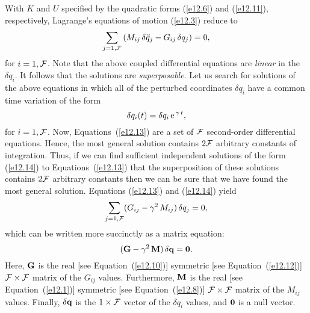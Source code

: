 With $K$ and $U$ specified by the quadratic forms (\ref{e12.6}) and (\ref{e12.11}), respectively, Lagrange's equations of motion (\ref{e12.3}) reduce to
\begin{equation}\label{e12.13}
\sum_{j=1,{\cal F}}\left(M_{ij}\,\delta\ddot{q}_j - G_{ij}\,\delta q_j\right) = 0,
\end{equation}
for $i=1,{\cal F}$. 
Note that the above coupled differential equations are {\em linear} in the $\delta q_i$. It follows
that the solutions are {\em superposable}.
Let us search for  solutions of the above equations in which all of the perturbed coordinates $\delta q_i$
have a common time variation of the form
\begin{equation}\label{e12.14}
\delta q_i(t) = \delta q_i\,{\rm e}^{\,\gamma\,t},
\end{equation}
for $i=1,{\cal F}$. 
Now, Equations~(\ref{e12.13}) are a set of ${\cal F}$ second-order differential equations.
Hence, the most general solution contains $2{\cal F}$ arbitrary constants of integration. Thus, if we can find sufficient independent solutions of the form (\ref{e12.14}) to Equations~(\ref{e12.13})  that the superposition
of these solutions contains $2{\cal F}$ arbitrary constants then we can be sure that we
have found the most general solution. Equations
(\ref{e12.13}) and (\ref{e12.14}) yield
\begin{equation}\label{e12.15}
\sum_{j=1,{\cal F}}(G_{ij}- \gamma^2\,M_{ij})\,\delta q_j = 0,
\end{equation}
which can be written more succinctly as a matrix equation:
\begin{equation}\label{e12.16}
({\bf G} - \gamma^2\,{\bf M})\,\delta\bf{q} = {\bf 0}.
\end{equation}
Here, ${\bf G}$ is the real [see Equation~(\ref{e12.10})] symmetric [see Equation~(\ref{e12.12})] ${\cal F}\times {\cal F}$ matrix of the $G_{ij}$ values. 
Furthermore, ${\bf M}$ is the real [see Equation~(\ref{e12.1})] symmetric [see Equation~(\ref{e12.8})] ${\cal F}\times {\cal F}$ matrix of the $M_{ij}$ values. Finally,
$\delta {\bf q}$ is the $1\times {\cal F}$ vector of the $\delta q_i$ values, and
${\bf 0}$ is a null vector.

